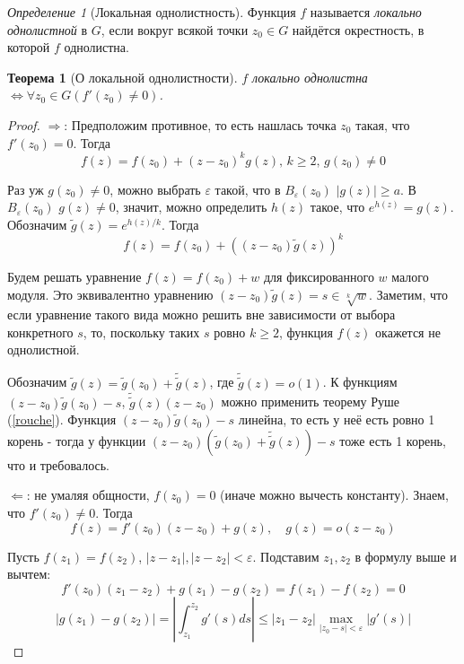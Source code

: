 \documentclass[12pt]{article}
\newcommand{\Ra}{\Rightarrow}
\newcommand{\La}{\Leftarrow}
\renewcommand{\iff}{\Leftrightarrow}
\newcounter{cnt}
\theoremstyle{thmnote}
\newtheorem{theorem}[cnt]{Теорема}
\theoremstyle{remark}
\theoremstyle{defnote}
\newtheorem{definition}[cnt]{Определение}
\begin{document}
\begin{definition}[Локальная однолистность]
    Функция $f$ называется \textit{локально однолистной} в $G$, если вокруг всякой точки $z_0 \in G$ найдётся окрестность, в которой $f$ однолистна.
\end{definition}

\begin{theorem}[О локальной однолистности]
    $f$ локально однолистна $\iff \forall z_0 \in G (f'(z_0) \neq 0)$. 
\end{theorem}
\begin{proof}
    $\Ra$: Предположим противное, то есть нашлась точка $z_0$ такая, что $f'(z_0) = 0$. Тогда
    \begin{equation*}
        f(z) = f(z_0) + (z - z_0)^k g(z),\, k \geq 2,\, g(z_0) \neq 0
    \end{equation*}

    Раз уж $g(z_0) \neq 0$, можно выбрать $\varepsilon$ такой, что в $B_\varepsilon(z_0)$ $|g(z)| \geq a$. В $B_\varepsilon(z_0)$ $g(z) \neq 0$, значит, можно определить $h(z)$ такое, что $e^{h(z)} = g(z)$. Обозначим $\tilde{g}(z) = e^{h(z) / k}$. Тогда
    \begin{equation*}
        f(z) = f(z_0) + \left( (z - z_0) \tilde{g}(z) \right)^k
    \end{equation*}

    Будем решать уравнение $f(z) = f(z_0) + w$ для фиксированного $w$ малого модуля. Это эквивалентно уравнению $(z - z_0)\tilde{g}(z) = s \in \sqrt[k]{w}$. Заметим, что если уравнение такого вида можно решить вне зависимости от выбора конкретного $s$, то, поскольку таких $s$ ровно $k \geq 2$, функция $f(z)$ окажется не однолистной.

    Обозначим $\tilde{g}(z) = \tilde{g}(z_0) + \tilde{\tilde{g}}(z)$, где $\tilde{\tilde{g}}(z) = o(1)$. К функциям $(z - z_0)\tilde{g}(z_0) - s$, $\tilde{\tilde{g}}(z)(z - z_0)$ можно применить теорему Руше (\ref{rouche}). Функция $(z - z_0)\tilde{g}(z_0) - s$ линейна, то есть у неё есть ровно 1 корень - тогда у функции $(z - z_0)(\tilde{g}(z_0) + \tilde{\tilde{g}}(z)) - s$ тоже есть 1 корень, что и требовалось.

    $\La$: не умаляя общности, $f(z_0) = 0$ (иначе можно вычесть константу). Знаем, что $f'(z_0) \neq 0$. Тогда
    \begin{equation}\tag{$\star$}
        f(z) = f'(z_0)(z - z_0) + g(z), \quad g(z) = o(z - z_0)
    \end{equation}

    Пусть $f(z_1) = f(z_2)$, $|z - z_1|, |z - z_2| < \varepsilon$. Подставим $z_1, z_2$ в формулу выше и вычтем:
    \begin{equation*}
        f'(z_0)(z_1 - z_2) + g(z_1) - g(z_2) = f(z_1) - f(z_2) = 0
    \end{equation*}
    \begin{equation*}
        |g(z_1) - g(z_2)| = \left| \int_{z_1}^{z_2} g'(s)ds \right| \leq |z_1 - z_2| \underset{|z_0 - s| < \varepsilon}{\max} |g'(s)|
    \end{equation*}


\end{proof}
\end{document}

